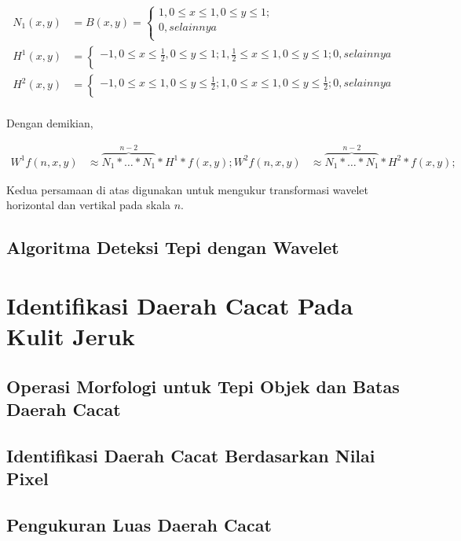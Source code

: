 \documentclass[laporan.tex]{subfiles}
\begin{document}
\begin{align}
	N_1(x,y) & = B(x,y) = \begin{cases}
		1, 0 \leq x \leq 1, 0 \leq y \leq 1; \\
		0, selainnya \\
	\end{cases} \\
	H^1(x,y) & = \begin{cases}
		-1, 0 \leq x \leq \frac{1}{2}, 0 \leq y \leq 1;
		1, \frac{1}{2} \leq x \leq 1, 0 \leq y \leq 1;
		0, selainnya \\
	\end{cases} \\
	H^2(x,y) & = \begin{cases}
		-1, 0 \leq x \leq 1, 0 \leq y \leq \frac{1}{2};
		1, 0 \leq x \leq 1, 0 \leq y \leq \frac{1}{2};
		0, selainnya \\
	\end{cases} \\
\end{align}

Dengan demikian,

\begin{align}
	W^1f(n,x,y) & \approx \overbrace{N_1 \ast \ldots \ast N_1}^{n-2} \ast H^1 \ast f(x,y);
	W^2f(n,x,y) & \approx \overbrace{N_1 \ast \ldots \ast N_1}^{n-2} \ast H^2 \ast f(x,y);
\end{align}

Kedua persamaan di atas digunakan untuk mengukur transformasi wavelet horizontal dan vertikal pada skala $n$.

\subsection{Algoritma Deteksi Tepi dengan Wavelet}

\section{Identifikasi Daerah Cacat Pada Kulit Jeruk}

\subsection{Operasi Morfologi untuk Tepi Objek dan Batas Daerah Cacat}

\subsection{Identifikasi Daerah Cacat Berdasarkan Nilai Pixel}

\subsection{Pengukuran Luas Daerah Cacat}
\end{document}
